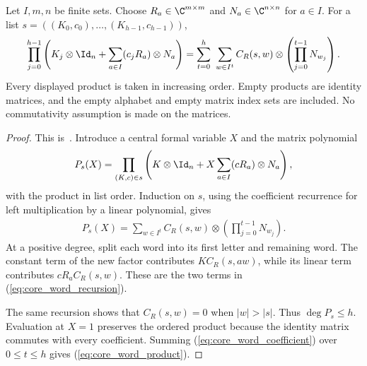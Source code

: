 \begin{lemma}
    \label{thm:core_word_product}
    \leanok
    Let $I,m,n$ be finite sets. Choose
    $R_a\in\C^{m\times m}$ and $N_a\in\C^{n\times n}$ for $a\in I$.
    For a list $s=((K_0,c_0),\ldots,(K_{h-1},c_{h-1}))$,
    \begin{align}
        \prod_{j=0}^{h-1}\left(K_j\otimes \Id_n+
        \sum_{a\in I}(c_jR_a)\otimes N_a\right)
        =\sum_{t=0}^{h}\ \sum_{w\in I^t}
        C_R(s,w)\otimes\left(\prod_{j=0}^{t-1}N_{w_j}\right).
        \label{eq:core_word_product}
    \end{align}
    Every displayed product is taken in increasing order. Empty products are
    identity matrices, and the empty alphabet and empty matrix index sets are
    included. No commutativity assumption is made on the matrices.
\end{lemma}
\begin{proof}\leanok
    This is~\cite[``Expansion over interior words'']{QICLean2026Blueprint}.
    Introduce a central formal variable $X$ and the matrix polynomial
    \begin{align}
        P_s(X)=\prod_{(K,c)\in s}
        \left(K\otimes \Id_n+X\sum_{a\in I}(cR_a)\otimes N_a\right),
        \label{eq:core_word_polynomial}
    \end{align}
    with the product in list order. Induction on $s$, using the coefficient
    recurrence for left multiplication by a linear polynomial, gives
    \begin{align}
        [X^t]P_s(X)=\sum_{w\in I^t}C_R(s,w)\otimes
        \left(\prod_{j=0}^{t-1}N_{w_j}\right).
        \label{eq:core_word_coefficient}
    \end{align}
    At a positive degree, split each word into its first letter and remaining
    word. The constant term of the new factor contributes
    $K C_R(s,aw)$, while its linear term contributes $cR_a C_R(s,w)$.
    These are the two terms in (\ref{eq:core_word_recursion}).

    The same recursion shows that $C_R(s,w)=0$ when $|w|>|s|$. Thus
    $\deg P_s\le h$. Evaluation at $X=1$ preserves the ordered product because
    the identity matrix commutes with every coefficient. Summing
    (\ref{eq:core_word_coefficient}) over $0\le t\le h$ gives
    (\ref{eq:core_word_product}).
\end{proof}
